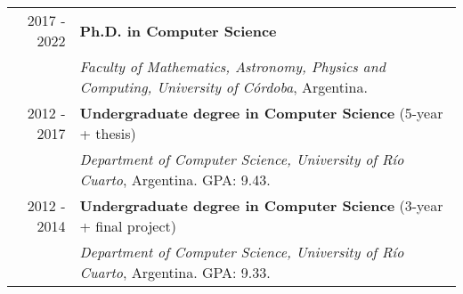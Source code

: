 \documentclass[a4paper,10pt]{article} %
\begin{document}
\begin{tabular}{rl}
\\
\textsc{2017 - 2022}	& \textbf{Ph.D. in Computer Science} \\
& \textit{Faculty of Mathematics, Astronomy, Physics and Computing, University of Córdoba}, Argentina. \\

\textsc{2012 - 2017}	& \textbf{Undergraduate degree in Computer Science} (5-year + thesis) \\
& \textit{Department of Computer Science, University of Río Cuarto}, Argentina. GPA: 9.43. \\

\textsc{2012 - 2014}	& \textbf{Undergraduate degree in Computer Science} (3-year + final project) \\
& \textit{Department of Computer Science, University of Río Cuarto}, Argentina. GPA: 9.33. \\

\end{tabular}
\end{document}
